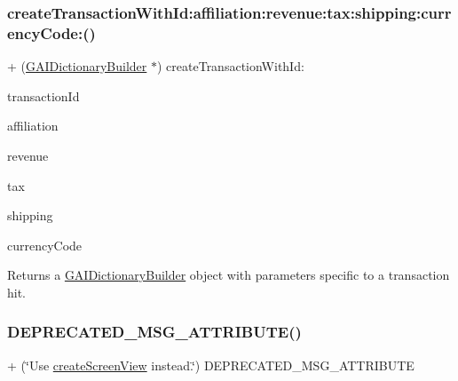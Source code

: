 \subsubsection{\texorpdfstring{create\+Transaction\+With\+Id\+:affiliation\+:revenue\+:tax\+:shipping\+:currency\+Code\+:()}{createTransactionWithId:affiliation:revenue:tax:shipping:currencyCode:()}}
{\footnotesize\ttfamily + (\hyperlink{interface_g_a_i_dictionary_builder}{G\+A\+I\+Dictionary\+Builder} $\ast$) create\+Transaction\+With\+Id\+: \begin{DoxyParamCaption}\item[{(N\+S\+String $\ast$)}]{transaction\+Id }\item[{affiliation:(N\+S\+String $\ast$)}]{affiliation }\item[{revenue:(N\+S\+Number $\ast$)}]{revenue }\item[{tax:(N\+S\+Number $\ast$)}]{tax }\item[{shipping:(N\+S\+Number $\ast$)}]{shipping }\item[{currencyCode:(N\+S\+String $\ast$)}]{currency\+Code }\end{DoxyParamCaption}}

Returns a \hyperlink{interface_g_a_i_dictionary_builder}{G\+A\+I\+Dictionary\+Builder} object with parameters specific to a transaction hit. \mbox{\label{interface_g_a_i_dictionary_builder_a586dc82641a9c622d590babf88290c10}} 
\subsubsection{\texorpdfstring{D\+E\+P\+R\+E\+C\+A\+T\+E\+D\+\_\+\+M\+S\+G\+\_\+\+A\+T\+T\+R\+I\+B\+U\+T\+E()}{DEPRECATED\_MSG\_ATTRIBUTE()}}
{\footnotesize\ttfamily + (\char`\"{}Use \hyperlink{interface_g_a_i_dictionary_builder_ae0fedd6923d4eb6a081b8ad8c301afbe}{create\+Screen\+View} instead.\char`\"{}) D\+E\+P\+R\+E\+C\+A\+T\+E\+D\+\_\+\+M\+S\+G\+\_\+\+A\+T\+T\+R\+I\+B\+U\+TE \begin{DoxyParamCaption}{ }\end{DoxyParamCaption}}

